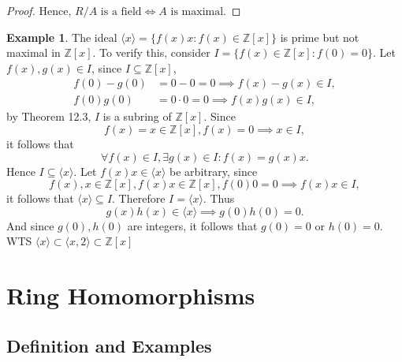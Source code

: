 \documentclass{article}
\theoremstyle{definition}
\newtheorem{definition}{Definition}[section]
\newtheorem{example}{Example}[section]
\begin{document}
\begin{proof}
      Hence, $R/A \text{ is a field} \iff A \text{ is maximal.}$
\end{proof}

\begin{example}
    The ideal $\langle x \rangle=\{f(x)x:f(x)\in\mathbb{Z}[x]\}$ is prime but not maximal in $\mathbb{Z}[x]$. To verify this, consider $I=\{f(x)\in\mathbb{Z}[x]:f(0)=0\}$. Let $f(x),g(x)\in I$, since $I \subseteq \mathbb{Z}[x]$,
    \begin{align*}
        f(0)-g(0)&=0-0=0 \implies f(x)-g(x)\in I,\\
        f(0)g(0)&=0\cdot0=0 \implies f(x)g(x)\in I,
    \end{align*}
    by Theorem 12.3, $I$ is a subring of $\mathbb{Z}[x]$. Since
    \begin{equation*}
        f(x)=x\in\mathbb{Z}[x],f(x)=0 \implies x\in I,
    \end{equation*}
    it follows that 
    \begin{equation*}
        \forall f(x)\in I, \exists g(x)\in I: f(x)=g(x)x.
    \end{equation*}
    Hence $I\subseteq\langle x\rangle$. Let $f(x)x\in\langle x \rangle$ be arbitrary, since 
    \begin{equation*}
        f(x),x\in\mathbb{Z}[x], f(x)x\in\mathbb{Z}[x], f(0)0=0 \implies f(x)x\in I,
    \end{equation*}
    it follows that $\langle x\rangle \subseteq I$. Therefore $I=\langle x \rangle$. Thus
    \begin{equation*}
        g(x)h(x)\in\langle x \rangle \implies g(0)h(0)=0.
    \end{equation*}
    And since $g(0),h(0)$ are integers, it follows that $g(0)=0$ or $h(0)=0$. WTS $\langle x \rangle \subset \langle x,2 \rangle \subset \mathbb{Z}[x]$
\end{example}

\section{Ring Homomorphisms}
\subsection{Definition and Examples}
\end{document}
